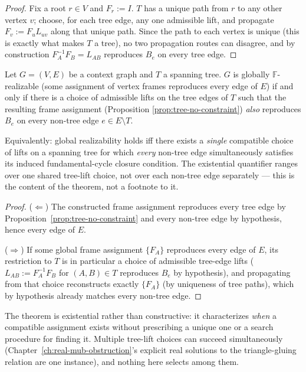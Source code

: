 \begin{proof}
Fix a root $r \in V$ and $F_r := I$. $T$ has a unique path from $r$ to any
other vertex $v$; choose, for each tree edge, any one admissible lift, and
propagate $F_v := F_u L_{uv}$ along that unique path. Since the path to each
vertex is unique (this is exactly what makes $T$ a tree), no two propagation
routes can disagree, and by construction $F_A^{-1}F_B = L_{AB}$ reproduces
$B_e$ on every tree edge.
\end{proof}

\begin{theorem}
\label{thm:graph-realizability}
Let $G=(V,E)$ be a context graph and $T$ a spanning tree. $G$ is globally
$\mathbb F$-realizable (some assignment of vertex frames reproduces every edge
of $E$) if and only if there is a choice of admissible lifts on the tree edges
of $T$ such that the resulting frame assignment (Proposition
\ref{prop:tree-no-constraint}) \emph{also} reproduces $B_e$ on every non-tree
edge $e \in E \setminus T$.

Equivalently: global realizability holds iff there exists a \emph{single}
compatible choice of lifts on a spanning tree for which \emph{every} non-tree
edge simultaneously satisfies its induced fundamental-cycle closure condition.
The existential quantifier ranges over one shared tree-lift choice, not over
each non-tree edge separately — this is the content of the theorem, not a
footnote to it.
\end{theorem}

\begin{proof}
($\Leftarrow$) The constructed frame assignment reproduces every tree edge by
Proposition~\ref{prop:tree-no-constraint} and every non-tree edge by
hypothesis, hence every edge of $E$.

($\Rightarrow$) If some global frame assignment $\{F_A\}$ reproduces every
edge of $E$, its restriction to $T$ is in particular a choice of admissible
tree-edge lifts ($L_{AB} := F_A^{-1}F_B$ for $(A,B) \in T$ reproduces $B_e$ by
hypothesis), and propagating from that choice reconstructs exactly $\{F_A\}$
(by uniqueness of tree paths), which by hypothesis already matches every
non-tree edge.
\end{proof}

The theorem is existential rather than constructive: it characterizes
\emph{when} a compatible assignment exists without prescribing a unique one
or a search procedure for finding it. Multiple tree-lift choices can succeed
simultaneously (Chapter~\ref{ch:real-mub-obstruction}'s explicit real
solutions to the triangle-gluing relation are one instance), and nothing
here selects among them.


